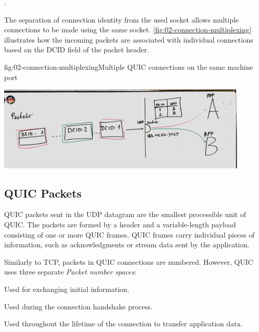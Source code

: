 .


The separation of connection identity from the used socket allows multiple connections to be made
using the same socket. \autoref{fig:02-connection-multiplexing} illustrates how the incoming packets
are associated with individual connections based on the DCID field of the packet header.

\begin{myFigure}{fig:02-connection-multiplexing}{Multiple QUIC connections on the same machine port}

\includegraphics[width=0.9\textwidth]{img/02-socket-multiplexing}

\end{myFigure}


\subsection{QUIC Packets}

QUIC packets sent in the UDP datagram are the smallest processible unit of QUIC\@. The packets are
formed by a header and a variable-length payload consisting of one or more QUIC frames. QUIC frames
carry individual pieces of information, such as acknowledgments or stream data sent by the
application.

Similarly to TCP, packets in QUIC connections are numbered. However, QUIC uses three separate
\textit{Packet number spaces}:

\begin{enumerate}

   Used for exchanging initial information.

   Used during the connection handshake process.

   Used throughout the lifetime of the connection to transfer application data.

\end{enumerate}

